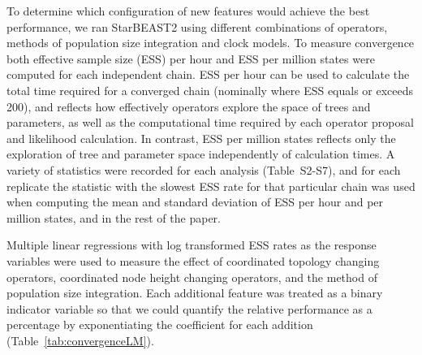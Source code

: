 \documentclass[12pt]{article}
\begin{document}
To determine which configuration of new features would achieve the best
performance, we ran StarBEAST2 using different combinations of operators,
methods of population size integration and clock models. To measure
convergence both effective sample size (ESS) per hour and ESS per million
states were computed for each independent chain. ESS per hour can be used to
calculate the total time required for a converged chain (nominally where ESS
equals or exceeds 200), and reflects how effectively operators explore the
space of trees and parameters, as well as the computational time required by
each operator proposal and likelihood calculation. In contrast, ESS per
million states reflects only the exploration of tree and parameter space
independently of calculation times. A variety of statistics were recorded for
each analysis (Table~S2-S7), and for each replicate the statistic with the
slowest ESS rate for that particular chain was used when computing the mean
and standard deviation of ESS per hour and per million states, and in the
rest of the paper.

Multiple linear regressions with log transformed ESS rates as the response
variables were used to measure the effect of coordinated topology changing
operators, coordinated node height changing operators, and the method of
population size integration. Each additional feature was treated as a binary
indicator variable so that we could quantify the relative performance as a
percentage by exponentiating the coefficient for each addition
(Table~\ref{tab:convergenceLM}).
\end{document}

